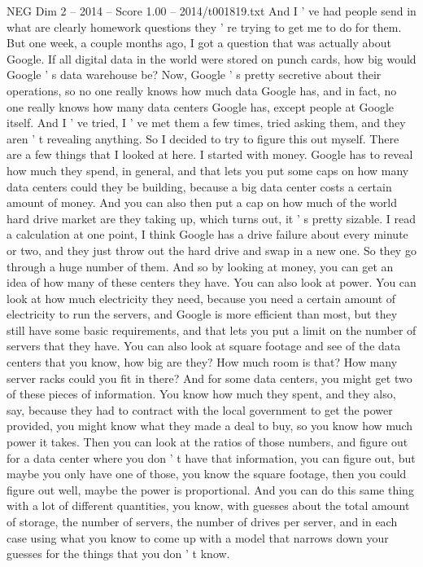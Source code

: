 \begin{textsample}{NEG Dim 2 – 2014 – Score 1.00 – 2014/t001819.txt}
And I ' ve had people send in what are clearly homework questions they ' re trying to get me to do for them.
But one week, a couple months ago, I got a question that was actually about Google.
If all digital data in the world were stored on punch cards, how big would Google ' s data warehouse be?
Now, Google ' s pretty secretive about their operations, so no one really knows how much data Google has, and in fact, no one really knows how many data centers Google has, except people at Google itself.
And I ' ve tried, I ' ve met them a few times, tried asking them, and they aren ' t revealing anything.
So I decided to try to figure this out myself.
There are a few things that I looked at here.
I started with money.
Google has to reveal how much they spend, in general, and that lets you put some caps on how many data centers could they be building, because a big data center costs a certain amount of money.
And you can also then put a cap on how much of the world hard drive market are they taking up, which turns out, it ' s pretty sizable.
I read a calculation at one point, I think Google has a drive failure about every minute or two, and they just throw out the hard drive and swap in a new one.
So they go through a huge number of them.
And so by looking at money, you can get an idea of how many of these centers they have.
You can also look at power.
You can look at how much electricity they need, because you need a certain amount of electricity to run the servers, and Google is more efficient than most, but they still have some basic requirements, and that lets you put a limit on the number of servers that they have.
You can also look at square footage and see of the data centers that you know, how big are they?
How much room is that?
How many server racks could you fit in there?
And for some data centers, you might get two of these pieces of information.
You know how much they spent, and they also, say, because they had to contract with the local government to get the power provided, you might know what they made a deal to buy, so you know how much power it takes.
Then you can look at the ratios of those numbers, and figure out for a data center where you don ' t have that information, you can figure out, but maybe you only have one of those, you know the square footage, then you could figure out well, maybe the power is proportional.
And you can do this same thing with a lot of different quantities, you know, with guesses about the total amount of storage, the number of servers, the number of drives per server, and in each case using what you know to come up with a model that narrows down your guesses for the things that you don ' t know.

\end{textsample}
